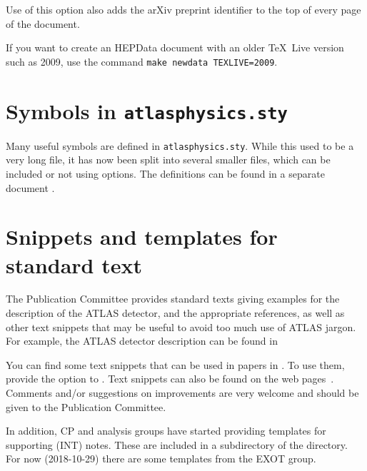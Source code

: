 Use of this option also adds the arXiv preprint identifier to the top
of every page of the document.

If you want to create an HEPData document with an older \TeX\ Live version such as 2009, 
use the command \texttt{make newdata TEXLIVE=2009}.


\section{Symbols in \texttt{atlasphysics.sty}}
\label{sec:atlasphysics}

Many useful symbols are defined in \texttt{atlasphysics.sty}.
While this used to be a very long file, it has now been split into several smaller files,
which can be included or not using options.
The definitions can be found in a separate document .


\section{Snippets and templates for standard text}
\label{sec:atlassnippets}

The Publication Committee provides standard texts giving examples
for the description of the ATLAS detector, and the appropriate references,
as well as other text snippets that may be useful to avoid too much use of ATLAS jargon.
For example, the ATLAS detector description can be found in 

You can find some text snippets that can be used in papers in .
To use them, provide the  option to .
Text snippets can also be found on the web pages~\cite{pubcom-snippet}.
Comments and/or suggestions on improvements are very welcome and
should be given to the Publication Committee.

In addition, CP and analysis groups have started providing templates for supporting (INT) notes.
These are included in a subdirectory of the  directory.
For now (2018-10-29) there are some templates from the EXOT group.


